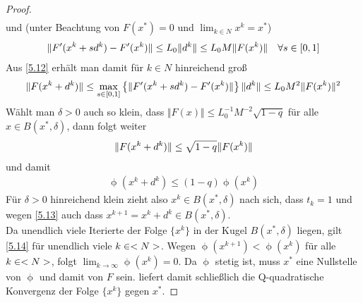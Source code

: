 \begin{proof}
\begin{align}
	\end{align}
	und (unter Beachtung von $F(x^\ast)=0$ und $\lim_{k\in N}x^k=x^\ast$)
	\begin{align}
		\Vert F'(x^k+sd^k) - F'(x^k)\Vert \le L_0\Vert d^k\Vert\le L_0M\Vert F(x^k)\Vert\quad\forall s\in [0,1]\notag
	\end{align}
	Aus \cref{5.12} erhält man damit für $k\in N$ hinreichend groß
	\begin{align}
		\Vert F(x^k+d^k)\Vert \le\max\limits_{s\in [0,1]} \left\lbrace \Vert F'(x^k + sd^k) - F'(x^k)\Vert\right\rbrace \Vert d^k\Vert\le L_0M^2\Vert F(x^k)\Vert^2\notag
	\end{align}
	Wählt man $\delta>0$ auch so klein, dass $\Vert F(x)\Vert\le L_0^{-1}M^{-2}\sqrt{1-q}$ für alle $x\in B(x^\ast,\delta)$, dann folgt weiter
	\begin{align}
		\Vert F(x^k+d^k)\Vert \le \sqrt{1-q}\Vert F(x^k)\Vert\notag 
	\end{align}
	und damit
	\begin{align}
		\label{5.14}
		\upphi(x^k+d^k) \le (1-q)\upphi(x^k)
	\end{align}
	Für $\delta>0$ hinreichend klein zieht also $x^k\in B(x^\ast,\delta)$ nach sich, dass $t_k=1$ und wegen \cref{5.13} auch dass $x^{k+1}=x^k+d^k\in B(x^\ast,\delta)$. \\
	Da unendlich viele Iterierte der Folge $\{x^k\}$ in der Kugel $B(x^\ast,\delta)$ liegen, gilt \cref{5.14} für unendlich viele $k\in <N>$. Wegen $\upphi(x^{k+1})<\upphi(x^k)$ für alle $k\in<N>$, folgt $\lim_{k\to\infty}\upphi(x^k)=0$. Da $\upphi$ stetig ist, muss $x^\ast$ eine Nullstelle von $\upphi$ und damit von $F$ sein.  liefert damit schließlich die Q-quadratische Konvergenz der Folge $\{x^k\}$ gegen $x^\ast$.
\end{proof}
